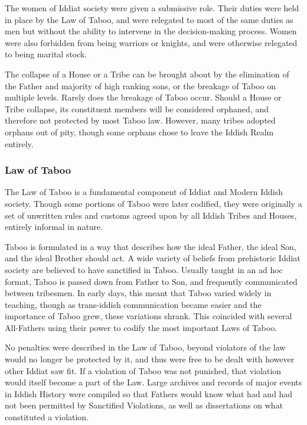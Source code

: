 			The women of Iddiat society were given a submissive role. Their duties were held in place by the Law of Taboo, and were relegated to most of the same duties as men but without the ability to intervene in the decision-making process. Women were also forbidden from being warriors or knights, and were otherwise relegated to being marital stock.\par 
			
			The collapse of a House or a Tribe can be brought about by the elimination of the Father and majority of high ranking sons, or the breakage of Taboo on multiple levels. Rarely does the breakage of Taboo occur. Should a House or Tribe collapse, its constituent members will be considered orphaned, and therefore not protected by most Taboo law. However, many tribes adopted orphans out of pity, though some orphans chose to leave the Iddish Realm entirely.
			
			\subsubsection{Law of Taboo}
			The Law of Taboo is a fundamental component of Iddiat and Modern Iddish society. Though some portions of Taboo were later codified, they were originally a set of unwritten rules and customs agreed upon by all Iddish Tribes and Houses, entirely informal in nature.\par 
			
			Taboo is formulated in a way that describes how the ideal Father, the ideal Son, and the ideal Brother should act. A wide variety of beliefs from prehistoric Iddiat society are believed to have sanctified in Taboo. Usually taught in an ad hoc format, Taboo is passed down from Father to Son, and frequently communicated between tribesmen. In early days, this meant that Taboo varied widely in teaching, though as trans-iddish communication became easier and the importance of Taboo grew, these variations shrank. This coincided with several All-Fathers using their power to codify the most important Laws of Taboo.\par
			
			No penalties were described in the Law of Taboo, beyond violators of the law would no longer be protected by it, and thus were free to be dealt with however other Iddiat saw fit. If a violation of Taboo was not punished, that violation would itself become a part of the Law. Large archives and records of major events in Iddish History were compiled so that Fathers would know what had and had not been permitted by Sanctified Violations, as well as dissertations on what constituted a violation.\par
			
